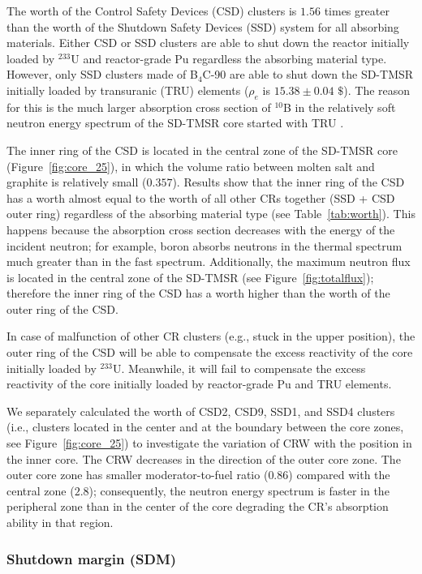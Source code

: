 The worth of the Control Safety Devices (CSD) clusters is $1.56$ times greater than 
the worth of the Shutdown Safety Devices (SSD) system for all absorbing materials. Either CSD or SSD 
clusters are able to shut down the reactor initially loaded by 
$^{233}$U and reactor-grade Pu regardless the absorbing material type.
However, only SSD clusters made of B$_4$C-90 are able to shut down the SD-TMSR 
initially loaded by transuranic (TRU) elements ($\rho_e$ is $15.38\pm0.04$ $\$$).
The reason for this is the much larger 
absorption cross section of $^{10}$B in the relatively soft neutron energy 
spectrum of the SD-TMSR core started with TRU \cite{ashraf2020Strategies}.

The inner ring of the CSD is located in the central zone of the SD-TMSR core 
(Figure~\ref{fig:core_25}), in which the volume ratio between molten salt and 
graphite is relatively small ($0.357$). Results show that the inner ring of the CSD has 
a worth almost equal to the worth of all other CRs together (SSD + CSD outer ring) regardless of 
the absorbing material type (see Table~\ref{tab:worth}). This happens because the absorption cross section
decreases with the energy of the incident neutron; for example, boron absorbs neutrons in the thermal spectrum much 
greater than in the fast spectrum. Additionally, the maximum neutron flux is located in the central zone of the SD-TMSR (see Figure~\ref{fig:totalflux}); therefore the inner ring of the CSD has a worth higher than the worth of the outer ring of the CSD.

In case of malfunction of other CR clusters (e.g., stuck in the upper 
position), the outer ring of the CSD will be able to compensate the excess reactivity of the core initially loaded by $^{233}$U.
Meanwhile, it will fail to compensate the excess 
reactivity of the core initially loaded by reactor-grade Pu and TRU elements.

We separately calculated the worth of CSD2, CSD9, SSD1, and SSD4 clusters (i.e., clusters located in the center and at the boundary between the core
zones, see Figure~\ref{fig:core_25}) to investigate the variation of CRW with the position in the inner core.
The CRW decreases in the direction of the outer core zone. The outer core zone 
has smaller moderator-to-fuel ratio ($0.86$) compared with the central zone 
($2.8$); consequently, the neutron energy spectrum is faster in the peripheral 
zone than in the center of the core degrading the CR's 
absorption ability in that region.

\subsubsection{Shutdown margin (SDM)}

